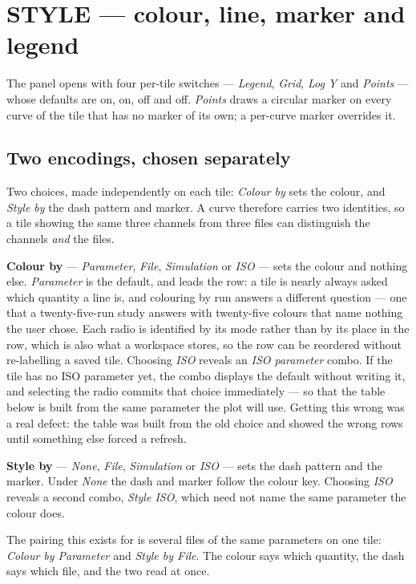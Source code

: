 \documentclass[11pt,a4paper,oneside]{report}
\begin{document}
\section{STYLE --- colour, line, marker and legend}
\label{sec:style}

The panel opens with four per-tile switches --- \emph{Legend}, \emph{Grid},
\emph{Log Y} and \emph{Points} --- whose defaults are on, on, off and off.
\emph{Points} draws a circular marker on every curve of the tile that has no
marker of its own; a per-curve marker overrides it.

\subsection{Two encodings, chosen separately}

Two choices, made independently on each tile: \emph{Colour by} sets the colour,
and \emph{Style by} the dash pattern and marker. A curve therefore carries two
identities, so a tile showing the same three channels from three files can
distinguish the channels \emph{and} the files.

\textbf{Colour by} --- \emph{Parameter}, \emph{File}, \emph{Simulation} or
\emph{ISO} --- sets the colour and nothing else. \emph{Parameter} is the default, and leads the
row: a tile is nearly always asked which quantity a line is, and colouring by
run answers a different question --- one that a twenty-five-run study answers
with twenty-five colours that name nothing the user chose. Each radio is
identified by its mode rather than by its place in the row, which is also what
a workspace stores, so the row can be reordered without re-labelling a saved
tile. Choosing \emph{ISO} reveals an \emph{ISO parameter}
combo. If the tile has no ISO parameter yet, the combo displays the default
without writing it, and selecting the radio commits that choice immediately ---
so that the table below is built from the same parameter the plot will use.
Getting this wrong was a real defect: the table was built from the old choice and
showed the wrong rows until something else forced a refresh.

\textbf{Style by} --- \emph{None}, \emph{File}, \emph{Simulation} or \emph{ISO}
--- sets the dash pattern and the marker. Under \emph{None} the dash and marker
follow the colour key. Choosing \emph{ISO} reveals a second
combo, \emph{Style ISO}, which need not name the same parameter the colour does.

The pairing this exists for is several files of the same parameters on one tile:
\emph{Colour by Parameter} and \emph{Style by File}. The colour says which
quantity, the dash says which file, and the two read at once.
\end{document}
